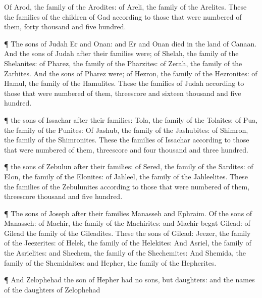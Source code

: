 {Of
Arod, the
family of the
Arodites: of
Areli, the
family of the
Arelites.
These
{} the
families of the
children of
Gad according to those that were
numbered of them,
forty
thousand and
five
hundred.
\par }{\PP {}¶ The
sons of
Judah
{}
Er and
Onan: and
Er and
Onan
died in the
land of
Canaan.
And the
sons of
Judah after their
families were; of
Shelah, the
family of the
Shelanites: of
Pharez, the
family of the
Pharzites: of
Zerah, the
family of the
Zarhites.
And the
sons of
Pharez were; of
Hezron, the
family of the
Hezronites: of
Hamul, the
family of the
Hamulites.
These
{} the
families of
Judah according to those that were
numbered of them, threescore and
sixteen
thousand and
five
hundred.
\par }{\PP {}¶
{} the
sons of
Issachar after their
families:
{}
Tola, the
family of the
Tolaites: of
Pua, the
family of the
Punites:
Of
Jashub, the
family of the
Jashubites: of
Shimron, the
family of the
Shimronites.
These
{} the
families of
Issachar according to those that were
numbered of them,
threescore and
four
thousand and
three
hundred.
\par }{\PP {}¶
{} the
sons of
Zebulun after their
families: of
Sered, the
family of the
Sardites: of
Elon, the
family of the
Elonites: of
Jahleel, the
family of the
Jahleelites.
These
{} the
families of the
Zebulunites according to those that were
numbered of them,
threescore
thousand and
five
hundred.
\par }{\PP {}¶ The
sons of
Joseph after their
families
{}
Manasseh and
Ephraim.
Of the
sons of
Manasseh: of
Machir, the
family of the
Machirites: and
Machir
begat
Gilead: of
Gilead
{} the
family of the
Gileadites.
These
{} the
sons of
Gilead:
{}
Jeezer, the
family of the
Jeezerites: of
Helek, the
family of the
Helekites:
And
{}
Asriel, the
family of the
Asrielites: and
{}
Shechem, the
family of the
Shechemites:
And
{}
Shemida, the
family of the
Shemidaites: and
{}
Hepher, the
family of the
Hepherites.
\par }{\PP {}¶ And
Zelophehad the
son of
Hepher had no
sons, but
daughters: and the
names of the
daughters of
Zelophehad
}

